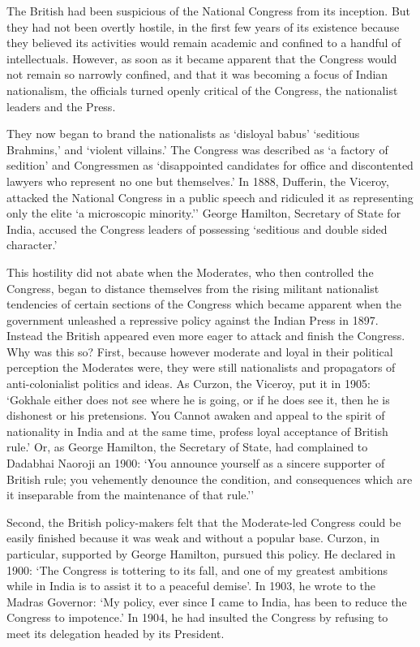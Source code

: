 The British had been suspicious of the National Congress from its inception. But they had not been overtly hostile, in the first few years of its existence because they believed its activities would remain academic and confined to a handful of intellectuals. However, as soon as it became apparent that the Congress would not remain so narrowly confined, and that it was becoming a focus of Indian nationalism, the officials turned openly critical of the Congress, the nationalist leaders and the Press.

They now began to brand the nationalists as `disloyal babus' `seditious Brahmins,' and `violent villains.' The Congress was described as `a factory of sedition' and Congressmen as `disappointed candidates for office and discontented lawyers who represent no one but themselves.' In 1888, Dufferin, the Viceroy, attacked the National Congress in a public speech and ridiculed it as representing only the elite `a microscopic minority.'' George Hamilton, Secretary of State for India, accused the Congress leaders of possessing `seditious and double sided character.'

This hostility did not abate when the Moderates, who then controlled the Congress, began to distance themselves from the rising militant nationalist tendencies of certain sections of the Congress which became apparent when the government unleashed a repressive policy against the Indian Press in 1897. Instead the British appeared even more eager to attack and finish the Congress. Why was this so? First, because however moderate and loyal in their political perception the Moderates were, they were still nationalists and propagators of anti-colonialist politics and ideas. As Curzon, the Viceroy, put it in 1905: `Gokhale either does not see where he is going, or if he does see it, then he is dishonest or his pretensions. You Cannot awaken and appeal to the spirit of nationality in India and at the same time, profess loyal acceptance of British rule.' Or, as George Hamilton, the Secretary of State, had complained to Dadabhai Naoroji an 1900: `You announce yourself as a sincere supporter of British rule; you vehemently denounce the condition, and consequences which are it inseparable from the maintenance of that rule.''

Second, the British policy-makers felt that the Moderate-led Congress could be easily finished because it was weak and without a popular base. Curzon, in particular, supported by George Hamilton, pursued this policy. He declared in 1900: `The Congress is tottering to its fall, and one of my greatest ambitions while in India is to assist it to a peaceful demise'. In 1903, he wrote to the Madras Governor: `My policy, ever since I came to India, has been to reduce the Congress to impotence.' In 1904, he had insulted the Congress by refusing to meet its delegation headed by its President.

